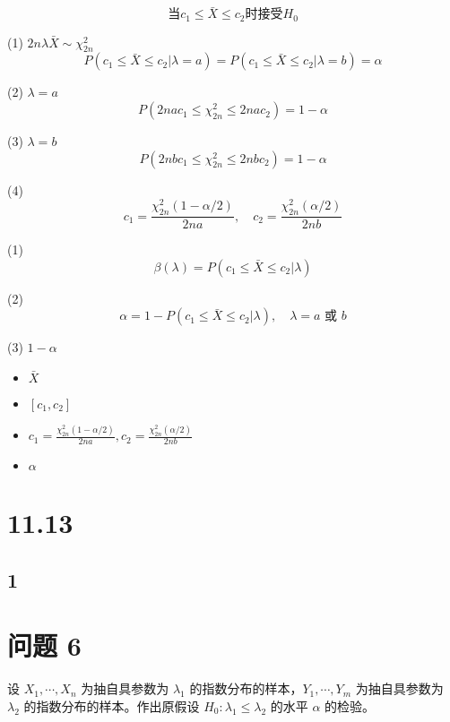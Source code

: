 \documentclass[UTF8]{report}
\theoremstyle{MyLineTheoremStyle} %
\theoremstyle{MyBlockTheoremStyle} %
\theoremstyle{MySubsubsectionStyle} %
\begin{document}
\[\text{当} c_1\leq\bar{X}\leq c_2 \text{时接受} H_0\]


(1)  $2n\lambda\bar{X} \sim \chi^2_{2n}$
\[P(c_1\leq\bar{X}\leq c_2|\lambda=a)=P(c_1\leq\bar{X}\leq c_2|\lambda=b)=\alpha\]

(2)  $\lambda=a$ 
\[P(2na c_1\leq \chi^2_{2n} \leq 2na c_2)=1-\alpha\]

(3)  $\lambda=b$ 
\[P(2nb c_1\leq \chi^2_{2n} \leq 2nb c_2)=1-\alpha\]

(4) 
\[c_1=\frac{\chi^2_{2n}(1-\alpha/2)}{2na}, \quad c_2=\frac{\chi^2_{2n}(\alpha/2)}{2nb}\]


(1) 
\[\beta(\lambda)=P(c_1\leq\bar{X}\leq c_2|\lambda)\]

(2) 
\[\alpha=1-P(c_1\leq\bar{X}\leq c_2|\lambda), \quad \lambda=a \text{ 或 } b\]

(3)  $1-\alpha$

\begin{itemize}
\item {} $\bar{X}$
\item {} $[c_1,c_2]$
\item {} $c_1=\frac{\chi^2_{2n}(1-\alpha/2)}{2na}, c_2=\frac{\chi^2_{2n}(\alpha/2)}{2nb}$
\item {} $\alpha$
\end{itemize}




\section{11.13}

\subsection{1}

\section*{问题 6}
设 $X_1,\cdots,X_n$ 为抽自具参数为 $\lambda_1$ 的指数分布的样本，$Y_1,\cdots,Y_m$ 为抽自具参数为 $\lambda_2$ 的指数分布的样本。作出原假设 $H_0:\lambda_1 \leqslant \lambda_2$ 的水平 $\alpha$ 的检验。
\end{document}
